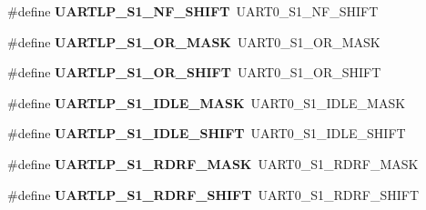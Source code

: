 \begin{DoxyCompactItemize}
\item 
\mbox{\label{group___backward___compatibility___symbols_ga92f53755733ec53ddfe0179c6d1174f4}} 
\#define {\bfseries U\+A\+R\+T\+L\+P\+\_\+\+S1\+\_\+\+N\+F\+\_\+\+S\+H\+I\+FT}~U\+A\+R\+T0\+\_\+\+S1\+\_\+\+N\+F\+\_\+\+S\+H\+I\+FT
\item 
\mbox{\label{group___backward___compatibility___symbols_ga51bf26e7fb5a1b387284db20561def28}} 
\#define {\bfseries U\+A\+R\+T\+L\+P\+\_\+\+S1\+\_\+\+O\+R\+\_\+\+M\+A\+SK}~U\+A\+R\+T0\+\_\+\+S1\+\_\+\+O\+R\+\_\+\+M\+A\+SK
\item 
\mbox{\label{group___backward___compatibility___symbols_gab29dfd93536cc8364a09450d30d8e6fc}} 
\#define {\bfseries U\+A\+R\+T\+L\+P\+\_\+\+S1\+\_\+\+O\+R\+\_\+\+S\+H\+I\+FT}~U\+A\+R\+T0\+\_\+\+S1\+\_\+\+O\+R\+\_\+\+S\+H\+I\+FT
\item 
\mbox{\label{group___backward___compatibility___symbols_ga96b6b702c4342c4af5004fb48b83efa7}} 
\#define {\bfseries U\+A\+R\+T\+L\+P\+\_\+\+S1\+\_\+\+I\+D\+L\+E\+\_\+\+M\+A\+SK}~U\+A\+R\+T0\+\_\+\+S1\+\_\+\+I\+D\+L\+E\+\_\+\+M\+A\+SK
\item 
\mbox{\label{group___backward___compatibility___symbols_gae842244614239cddb394428e2e1f8bc0}} 
\#define {\bfseries U\+A\+R\+T\+L\+P\+\_\+\+S1\+\_\+\+I\+D\+L\+E\+\_\+\+S\+H\+I\+FT}~U\+A\+R\+T0\+\_\+\+S1\+\_\+\+I\+D\+L\+E\+\_\+\+S\+H\+I\+FT
\item 
\mbox{\label{group___backward___compatibility___symbols_gac731a20d480bddb1610a7a740e71ebc9}} 
\#define {\bfseries U\+A\+R\+T\+L\+P\+\_\+\+S1\+\_\+\+R\+D\+R\+F\+\_\+\+M\+A\+SK}~U\+A\+R\+T0\+\_\+\+S1\+\_\+\+R\+D\+R\+F\+\_\+\+M\+A\+SK
\item 
\mbox{\label{group___backward___compatibility___symbols_ga431c49f191f29ccbeade2bd87502531c}} 
\#define {\bfseries U\+A\+R\+T\+L\+P\+\_\+\+S1\+\_\+\+R\+D\+R\+F\+\_\+\+S\+H\+I\+FT}~U\+A\+R\+T0\+\_\+\+S1\+\_\+\+R\+D\+R\+F\+\_\+\+S\+H\+I\+FT
\item 

\end{DoxyCompactItemize}
